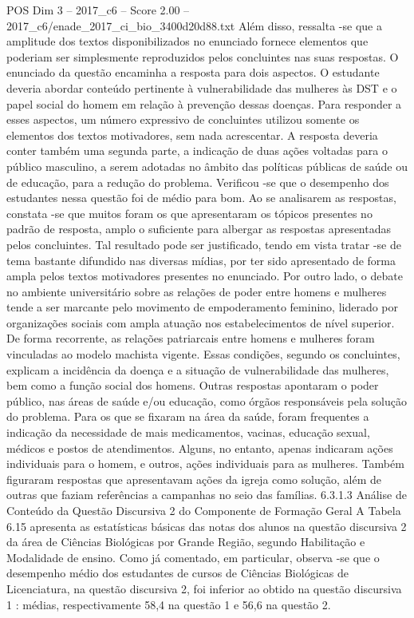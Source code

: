 \begin{textsample}{POS Dim 3 – 2017\_c6 – Score 2.00 – 2017\_c6/enade\_2017\_ci\_bio\_3400d20d88.txt}
Além disso, ressalta -se que a amplitude dos textos disponibilizados no enunciado fornece elementos que poderiam ser simplesmente reproduzidos pelos concluintes nas suas respostas.
O enunciado da questão encaminha a resposta para dois aspectos.
O estudante deveria abordar conteúdo pertinente à vulnerabilidade das mulheres às DST e o papel social do homem em relação à prevenção dessas doenças.
Para responder a esses aspectos, um número expressivo de concluintes utilizou somente os elementos dos textos motivadores, sem nada acrescentar.
A resposta deveria conter também uma segunda parte, a indicação de duas ações voltadas para o público masculino, a serem adotadas no âmbito das políticas públicas de saúde ou de educação, para a redução do problema.
Verificou -se que o desempenho dos estudantes nessa questão foi de médio para bom.
Ao se analisarem as respostas, constata -se que muitos foram os que apresentaram os tópicos presentes no padrão de resposta, amplo o suficiente para albergar as respostas apresentadas pelos concluintes.
Tal resultado pode ser justificado, tendo em vista tratar -se de tema bastante difundido nas diversas mídias, por ter sido apresentado de forma ampla pelos textos motivadores presentes no enunciado.
Por outro lado, o debate no ambiente universitário sobre as relações de poder entre homens e mulheres tende a ser marcante pelo movimento de empoderamento feminino, liderado por organizações sociais com ampla atuação nos estabelecimentos de nível superior.
De forma recorrente, as relações patriarcais entre homens e mulheres foram vinculadas ao modelo machista vigente.
Essas condições, segundo os concluintes, explicam a incidência da doença e a situação de vulnerabilidade das mulheres, bem como a função social dos homens.
Outras respostas apontaram o poder público, nas áreas de saúde e/ou educação, como órgãos responsáveis pela solução do problema.
Para os que se fixaram na área da saúde, foram frequentes a indicação da necessidade de mais medicamentos, vacinas, educação sexual, médicos e postos de atendimentos.
Alguns, no entanto, apenas indicaram ações individuais para o homem, e outros, ações individuais para as mulheres.
Também figuraram respostas que apresentavam ações da igreja como solução, além de outras que faziam referências a campanhas no seio das famílias. 6.3.1.3 Análise de Conteúdo da Questão Discursiva 2 do Componente de Formação Geral A Tabela 6.15 apresenta as estatísticas básicas das notas dos alunos na questão discursiva 2 da área de Ciências Biológicas por Grande Região, segundo Habilitação e Modalidade de ensino.
Como já comentado, em particular, observa -se que o desempenho médio dos estudantes de cursos de Ciências Biológicas de Licenciatura, na questão discursiva 2, foi inferior ao obtido na questão discursiva 1 : médias, respectivamente 58,4 na questão 1 e 56,6 na questão 2.

\end{textsample}
